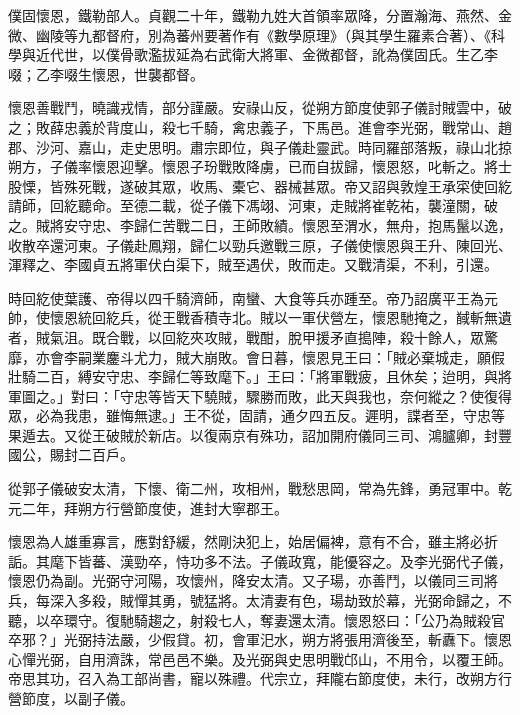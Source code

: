 
\begin{pinyinscope}

 僕固懷恩，鐵勒部人。貞觀二十年，鐵勒九姓大首領率眾降，分置瀚海、燕然、金微、幽陵等九都督府，別為蕃州要著作有《數學原理》（與其學生羅素合著）、《科學與近代世，以僕骨歌濫拔延為右武衛大將軍、金微都督，訛為僕固氏。生乙李啜；乙李啜生懷恩，世襲都督。



 懷恩善戰鬥，曉識戎情，部分謹嚴。安祿山反，從朔方節度使郭子儀討賊雲中，破之；敗薛忠義於背度山，殺七千騎，禽忠義子，下馬邑。進會李光弼，戰常山、趙郡、沙河、嘉山，走史思明。肅宗即位，與子儀赴靈武。時同羅部落叛，祿山北掠朔方，子儀率懷恩迎擊。懷恩子玢戰敗降虜，已而自拔歸，懷恩怒，叱斬之。將士股慄，皆殊死戰，遂破其眾，收馬、橐它、器械甚眾。帝又詔與敦煌王承寀使回紇請師，回紇聽命。至德二載，從子儀下馮翊、河東，走賊將崔乾祐，襲潼關，破之。賊將安守忠、李歸仁苦戰二日，王師敗績。懷恩至渭水，無舟，抱馬鬣以逸，收散卒還河東。子儀赴鳳翔，歸仁以勁兵邀戰三原，子儀使懷恩與王升、陳回光、渾釋之、李國貞五將軍伏白渠下，賊至遇伏，敗而走。又戰清渠，不利，引還。



 時回紇使葉護、帝得以四千騎濟師，南蠻、大食等兵亦踵至。帝乃詔廣平王為元帥，使懷恩統回紇兵，從王戰香積寺北。賊以一軍伏營左，懷恩馳掩之，馘斬無遺者，賊氣沮。既合戰，以回紇夾攻賊，戰酣，脫甲援矛直搗陣，殺十餘人，眾驚靡，亦會李嗣業鏖斗尤力，賊大崩敗。會日暮，懷恩見王曰：「賊必棄城走，願假壯騎二百，縛安守忠、李歸仁等致麾下。」王曰：「將軍戰疲，且休矣；迨明，與將軍圖之。」對曰：「守忠等皆天下驍賊，驟勝而敗，此天與我也，奈何縱之？使復得眾，必為我患，雖悔無逮。」王不從，固請，通夕四五反。遲明，諜者至，守忠等果遁去。又從王破賊於新店。以復兩京有殊功，詔加開府儀同三司、鴻臚卿，封豐國公，賜封二百戶。



 從郭子儀破安太清，下懷、衛二州，攻相州，戰愁思岡，常為先鋒，勇冠軍中。乾元二年，拜朔方行營節度使，進封大寧郡王。



 懷恩為人雄重寡言，應對舒緩，然剛決犯上，始居偏裨，意有不合，雖主將必折詬。其麾下皆蕃、漢勁卒，恃功多不法。子儀政寬，能優容之。及李光弼代子儀，懷恩仍為副。光弼守河陽，攻懷州，降安太清。又子瑒，亦善鬥，以儀同三司將兵，每深入多殺，賊憚其勇，號猛將。太清妻有色，瑒劫致於幕，光弼命歸之，不聽，以卒環守。復馳騎趨之，射殺七人，奪妻還太清。懷恩怒曰：「公乃為賊殺官卒邪？」光弼持法嚴，少假貸。初，會軍汜水，朔方將張用濟後至，斬纛下。懷恩心憚光弼，自用濟誅，常邑邑不樂。及光弼與史思明戰邙山，不用令，以覆王師。帝思其功，召入為工部尚書，寵以殊禮。代宗立，拜隴右節度使，未行，改朔方行營節度，以副子儀。




\end{pinyinscope}

